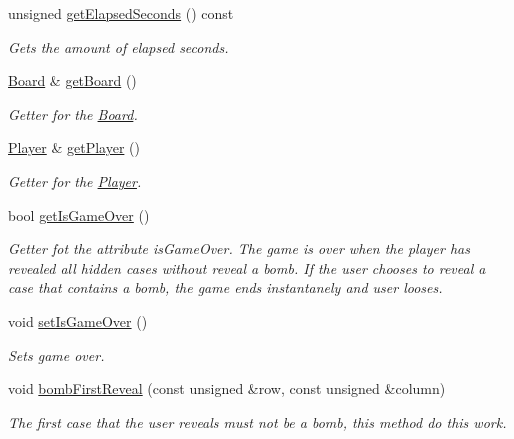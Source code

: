 \begin{DoxyCompactItemize}
\mbox{\label{class_game_a2472a36f44bd9c7a3e2650227d02c586}} 
unsigned \hyperlink{class_game_a2472a36f44bd9c7a3e2650227d02c586}{get\+Elapsed\+Seconds} () const
\begin{DoxyCompactList}\small\item\em Gets the amount of elapsed seconds. \end{DoxyCompactList}\item 
\mbox{\label{class_game_a8020f7bad85e31c3b4f4931db32093f7}} 
\hyperlink{class_board}{Board} \& \hyperlink{class_game_a8020f7bad85e31c3b4f4931db32093f7}{get\+Board} ()
\begin{DoxyCompactList}\small\item\em Getter for the \hyperlink{class_board}{Board}. \end{DoxyCompactList}\item 
\mbox{\label{class_game_a618cd24f8a672720ed085f41cf90af6f}} 
\hyperlink{class_player}{Player} \& \hyperlink{class_game_a618cd24f8a672720ed085f41cf90af6f}{get\+Player} ()
\begin{DoxyCompactList}\small\item\em Getter for the \hyperlink{class_player}{Player}. \end{DoxyCompactList}\item 
bool \hyperlink{class_game_aa57c57fa12655c4a877e06a291d215fc}{get\+Is\+Game\+Over} ()
\begin{DoxyCompactList}\small\item\em Getter fot the attribute \textquotesingle{}is\+Game\+Over\textquotesingle{}. The game is over when the player has revealed all hidden cases without reveal a bomb. If the user chooses to reveal a case that contains a bomb, the game ends instantanely and user looses. \end{DoxyCompactList}\item 
\mbox{\label{class_game_a890d9351fa8947f2b70e5d0c20dc8c6c}} 
void \hyperlink{class_game_a890d9351fa8947f2b70e5d0c20dc8c6c}{set\+Is\+Game\+Over} ()
\begin{DoxyCompactList}\small\item\em Sets game over. \end{DoxyCompactList}\item 
void \hyperlink{class_game_adcbcc007e6a362957ed347373285206b}{bomb\+First\+Reveal} (const unsigned \&row, const unsigned \&column)
\begin{DoxyCompactList}\small\item\em The first case that the user reveals must not be a bomb, this method do this work. \end{DoxyCompactList}\end{DoxyCompactItemize}
